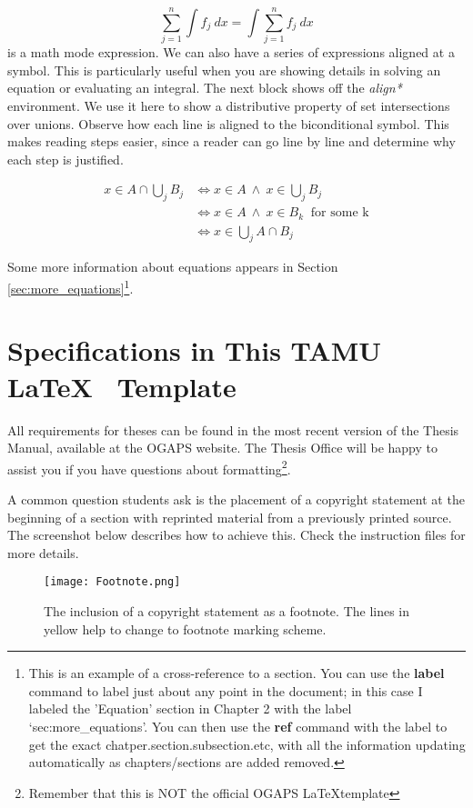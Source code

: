 \[ \sum_{j = 1} ^n \int f_j \ dx = \int \sum_{j = 1} ^n f_j \ dx \]
is a math mode expression. We can also have a series of expressions aligned at a symbol. This is particularly useful when you are showing details in solving an equation or evaluating an integral. The next block shows off the \textit{align*} environment. We use it here to show a distributive property of set intersections over unions. Observe how each line is aligned to the biconditional symbol. This makes reading steps easier, since a reader can go line by line and determine why each step is justified.

\begin{align*}
x \in A \cap \bigcup_{j} B_j &\iff x \in A \ \wedge \ x \in \bigcup_{j} B_j \\
&\iff x \in A \ \wedge \ x \in B_k \ \text{ for some k} \\
&\iff x \in \bigcup_{j} A \cap B_j
\end{align*}

Some more information about equations appears in Section \ref{sec:more_equations}\footnote{This is an example of a cross-reference to a section. You can use the {\bf label} command to label just about any point in the document; in this case I labeled the 'Equation' section in Chapter 2 with the label `sec:more\_equations'. You can then use the {\bf ref} command with the label to get the exact chatper.section.subsection.etc, with all the information updating automatically as chapters/sections are added removed.}.


\section{Specifications in This TAMU \LaTeX ~ Template}

All requirements for theses can be found in the most recent version of the Thesis Manual, available at the \ac{OGAPS} website. The Thesis Office will be happy to assist you if you have questions about formatting\footnote{Remember that this is NOT the official OGAPS \LaTeX template}.

A common question students ask is the placement of a copyright statement at the beginning of a section with reprinted material from a previously printed source. The screenshot below describes how to achieve this. Check the instruction files for more details.

\begin{figure}[ht!]
\centering
	\texttt{[image: Footnote.png]}
	\caption{The inclusion of a copyright statement as a footnote. The lines in yellow help to change to footnote marking scheme.}
\end{figure}
